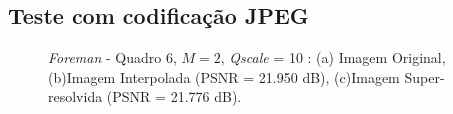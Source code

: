 \subsection{Teste com codificação JPEG}
\begin{figure}[H]
    \centering
    \qquad
	\qquad

    \caption{\textit{Foreman} - Quadro 6, $M = 2$, \textit{Qscale} = 10 : (a) Imagem Original, (b)Imagem Interpolada (PSNR = 21.950 dB), (c)Imagem Super-resolvida (PSNR = 21.776 dB).}
	    
    \label{fig:1}
\end{figure}

